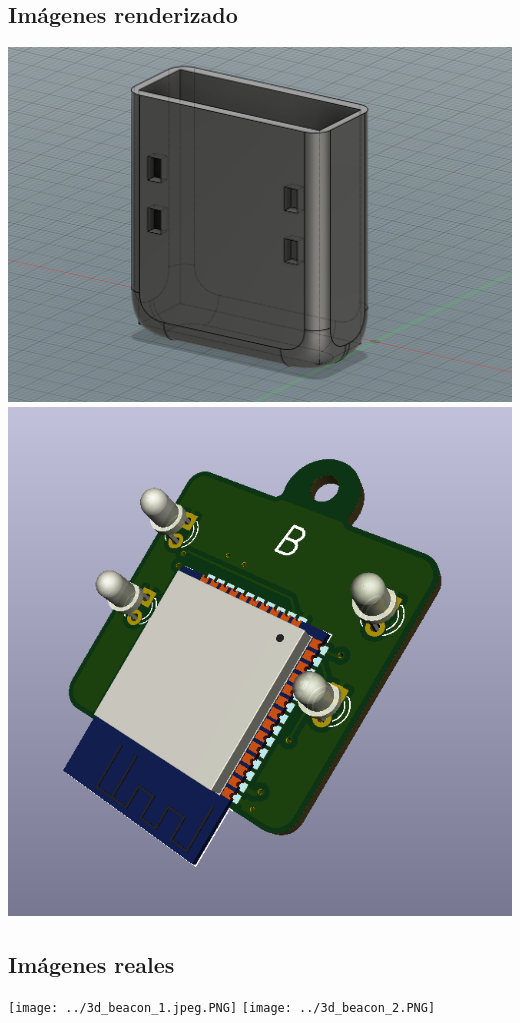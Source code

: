 \documentclass[a4paper ,12pt, onecolumn]{article}
\begin{document}
    \subsection{Imágenes renderizado}
    \begin{center}
        \includegraphics[scale=0.25]{../mechanical_beacon.PNG}
        \includegraphics[scale=0.25]{../emiter_1.PNG}
    \end{center}
    \subsection{Imágenes reales}
        \texttt{[image: ../3d\_beacon\_1.jpeg.PNG]}
        \texttt{[image: ../3d\_beacon\_2.PNG]}
\end{document}
